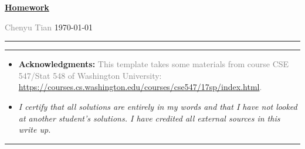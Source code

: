\documentclass[a4paper]{article}
\begin{document}
\courseheader



\setcounter{hwcnt}{1} %

\begin{center}
  \underline{\bf Homework \thehwcnt} \\
\end{center}
\begin{flushleft}
  \textcolor{gray}{Chenyu Tian}\hfill
  \today
\end{flushleft}
\hrule

\vspace{2em}

\flushleft
\rule{\textwidth}{1pt}
\begin{itemize}
\item {\bf Acknowledgments: \/} 
  \textcolor{gray}{This template takes some materials from course CSE 547/Stat 548 of Washington University: \small{\url{https://courses.cs.washington.edu/courses/cse547/17sp/index.html}}.}

\item  \emph{I certify that all solutions are entirely in my words and that I have not looked at another student's solutions. I have credited all external sources in this write up.}
\end{itemize}
\rule{\textwidth}{1pt}


\vspace{2em}
\end{document}
